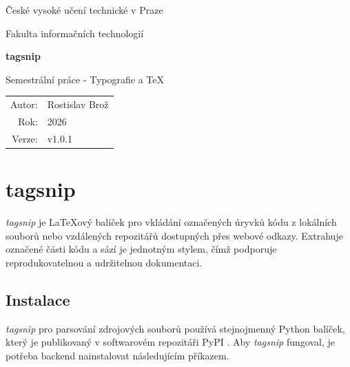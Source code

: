 \documentclass{article}
\begin{document}
\hypersetup{pageanchor=false}
\begin{titlepage}
    \centering

    {\Large České vysoké učení technické v Praze\par}
    {\Large Fakulta informačních technologií\par}

    \vspace{3cm}

    {\Huge\bfseries tagsnip\par}

    \vspace{0.5cm}

    {\Large Semestrální práce - Typografie a \TeX\par}

    \vfill

    \begin{tabular}{rl}
        Autor: & Rostislav Brož \\
        Rok: & 2026 \\
        Verze: & v1.0.1 \\
    \end{tabular}

    \vspace{2cm}
\end{titlepage}

\hypersetup{pageanchor=true}
\clearpage
{}

\section*{tagsnip}

\textit{tagsnip} je \LaTeX{}ový balíček pro vkládání označených úryvků kódu z lokálních souborů 
nebo vzdálených repozitářů dostupných přes webové odkazy. 
Extrahuje označené části kódu a sází je jednotným stylem, 
čímž podporuje reprodukovatelnou a udržitelnou dokumentaci.

\subsection*{Instalace}

\textit{tagsnip} pro parsování zdrojových souborů používá stejnojmenný Python balíček,
který je publikovaný v softwarovém repozitáři PyPI \citep{pypi}. 
Aby \textit{tagsnip} fungoval, je potřeba backend nainstalovat následujícím příkazem.

\end{document}
